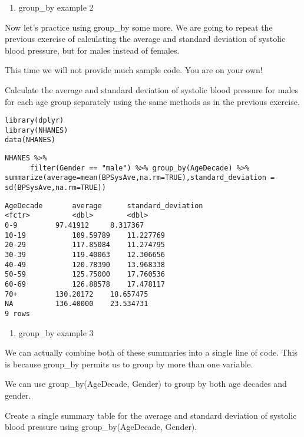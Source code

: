 \documentclass[]{article}
\providecommand{\tightlist}{%
  \setlength{\itemsep}{0pt}\setlength{\parskip}{0pt}}
\begin{document}
\begin{enumerate}
\def\labelenumi{\arabic{enumi}.}
\setcounter{enumi}{5}
\tightlist
\item
  group\_by example 2
\end{enumerate}

Now let's practice using group\_by some more. We are going to repeat the
previous exercise of calculating the average and standard deviation of
systolic blood pressure, but for males instead of females.

This time we will not provide much sample code. You are on your own!

Calculate the average and standard deviation of systolic blood pressure
for males for each age group separately using the same methods as in the
previous exercise.

\begin{verbatim}
library(dplyr)
library(NHANES)
data(NHANES)
\end{verbatim}

\begin{verbatim}
NHANES %>%
      filter(Gender == "male") %>% group_by(AgeDecade) %>% summarize(average=mean(BPSysAve,na.rm=TRUE),standard_deviation = sd(BPSysAve,na.rm=TRUE))
\end{verbatim}

\begin{verbatim}
AgeDecade       average      standard_deviation
<fctr>          <dbl>        <dbl>
0-9         97.41912     8.317367
10-19           109.59789    11.227769
20-29           117.85084    11.274795
30-39           119.40063    12.306656
40-49           120.78390    13.968338
50-59           125.75000    17.760536
60-69           126.88578    17.478117
70+         130.20172    18.657475
NA          136.40000    23.534731
9 rows
\end{verbatim}

\begin{enumerate}
\def\labelenumi{\arabic{enumi}.}
\setcounter{enumi}{6}
\tightlist
\item
  group\_by example 3
\end{enumerate}

We can actually combine both of these summaries into a single line of
code. This is because group\_by permits us to group by more than one
variable.

We can use group\_by(AgeDecade, Gender) to group by both age decades and
gender.

Create a single summary table for the average and standard deviation of
systolic blood pressure using group\_by(AgeDecade, Gender).
\end{document}
